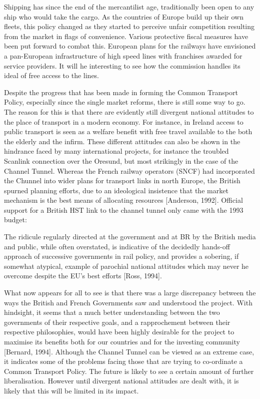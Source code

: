 Shipping has since the end of the mercantilist age, traditionally been open to any ship who would take the cargo. As the countries of Europe build up their own fleets, this policy changed as they started to perceive unfair competition resulting from the market in flags of convenience. Various protective fiscal measures have been put forward to combat this. European plans for the railways have envisioned a pan-European infrastructure of high speed lines with franchises awarded for service providers. It will he interesting to see how the commission handles its ideal of free access to the lines.

Despite the progress that has been made in forming the Common Transport Policy, especially since the single market reforms, there is still some way to go. The reason for this is that there are evidently still divergent national attitudes to the place of transport in a modern economy. For instance, in Ireland access to public transport is seen as a welfare benefit with free travel available to the both the elderly and the infirm. These different attitudes can also be shown in the hindrance faced by many international projects, for instance the troubled Scanlink connection over the Oresund, but most strikingly in the case of the Channel Tunnel. Whereas the French railway operators (SNCF) had incorporated the Chunnel into wider plans for transport links in north Europe, the British spurned planning efforts, due to an ideological insistence that the market mechanism is the best means of allocating resources [Anderson, 1992]. Official support for a British HST link to the channel tunnel only came with the 1993 budget:

\begin{displayquote}
The ridicule regularly directed at the government and at BR by the British media and public, while often overstated, is indicative of the decidedly hands-off approach of successive governments in rail policy, and provides a sobering, if somewhat atypical, example of parochial national attitudes which may never he overcome despite the EU's best efforts [Ross, 1994].
\end{displayquote}

What now appears for all to see is that there was a large discrepancy between the ways the British and French Governments saw and understood the project. With hindsight, it seems that a much better understanding between the two governments of their respective goals, and a rapprochement between their respective philosophies, would have been highly desirable for the project to maximise its benefits both for our countries and for the investing community [Bernard, 1994]. Although the Channel Tunnel can be viewed as an extreme case, it indicates some of the problems facing those that are trying to co-ordinate a Common Transport Policy. The future is likely to see a certain amount of further liberalisation. However until divergent national attitudes are dealt with, it is likely that this will be limited in its impact.